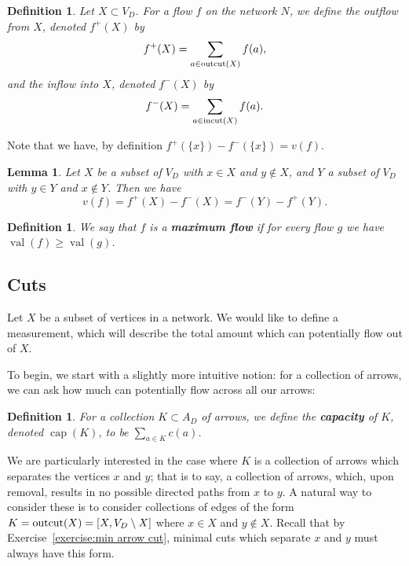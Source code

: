 \documentclass[12pt]{report}
\theoremstyle{plain}
\newtheorem{defn}[thm]{Definition}
\newtheorem{lem}[thm]{Lemma}
\newcommand{\oper}[1]{\operatorname{#1}}
\newcommand{\Xb}[1]{\textbf{#1}\index{#1}}
\begin{document}
\begin{defn}
Let $X \subset V_D$. For a flow $f$ on the network $N$, we define the
outflow from $X$, denoted $f^+(X)$ by
\[ f^+(X) = \sum_{a \in \outcut(X)} f(a), \]
and the inflow into $X$, denoted $f^-(X)$ by
\[ f^-(X) = \sum_{a \in \incut(X)} f(a).\]
\end{defn}

Note that we have, by definition $f^+(\{x\}) - f^-(\{x\}) = v(f)$.

\begin{lem}
Let $X$ be a subset of $V_D$ with $x \in X$ and $y \not\in X$, and $Y$ a
subset of $V_D$ with $y \in Y$ and $x \not\in Y$. Then we have
\[ v(f) = f^+(X) - f^-(X) = f^-(Y) - f^+(Y).\]
\end{lem}

\newcommand{\val}{\oper{val}}
\begin{defn}
We say that $f$ is a \Xb{maximum flow} if for every flow $g$ we have
$\val(f) \geq \val(g)$.
\end{defn}

\subsection{Cuts}

\newcommand{\capacity}{\oper{cap}}

Let $X$ be a subset of vertices in a network. We would like to define a
measurement, which will describe the total
amount which can potentially flow out of $X$.

To begin, we start with a slightly more intuitive notion: for a collection
of arrows, we can ask how much can potentially flow across all our arrows:

\begin{defn}
For a collection $K \subset A_D$ of arrows, we define the \Xb{capacity} of
$K$, denoted $\capacity(K)$, to be $\sum_{a \in K} c(a)$.
\end{defn}

We are particularly interested in the case where $K$ is a collection of
arrows which separates the vertices $x$ and $y$; that is to say, a
collection of arrows, which, upon removal, results in no possible directed
paths from $x$ to $y$. A natural way to consider these is to consider
collections of edges of the form $K = \outcut(X) = [X, V_D \setminus X]$
where $x \in X$ and $y \not\in X$. Recall that by
Exercise~\ref{exercise:min arrow cut}, minimal cuts which separate $x$ and
$y$ must always have this form.
\end{document}
